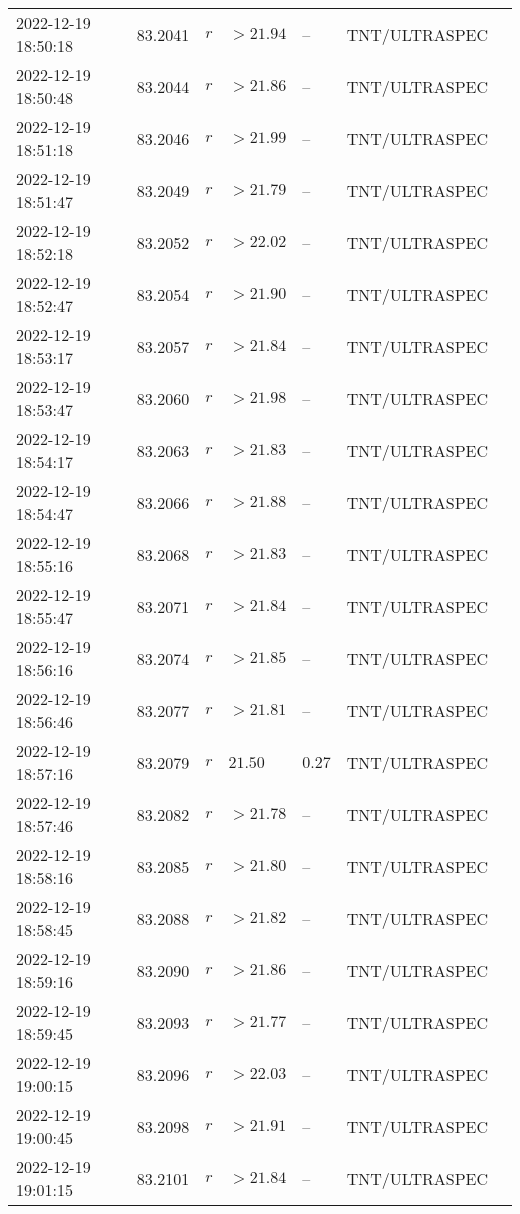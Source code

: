 \documentclass{nature_plusfigure}
\begin{document}
\begin{supplement}
\begin{center}
\begin{longtable}{lllllll}
2022-12-19 18:50:18 & 83.2041 & $r$ & $>21.94$ & -- & TNT/ULTRASPEC &  \\ 
2022-12-19 18:50:48 & 83.2044 & $r$ & $>21.86$ & -- & TNT/ULTRASPEC &  \\ 
2022-12-19 18:51:18 & 83.2046 & $r$ & $>21.99$ & -- & TNT/ULTRASPEC &  \\ 
2022-12-19 18:51:47 & 83.2049 & $r$ & $>21.79$ & -- & TNT/ULTRASPEC &  \\ 
2022-12-19 18:52:18 & 83.2052 & $r$ & $>22.02$ & -- & TNT/ULTRASPEC &  \\ 
2022-12-19 18:52:47 & 83.2054 & $r$ & $>21.90$ & -- & TNT/ULTRASPEC &  \\ 
2022-12-19 18:53:17 & 83.2057 & $r$ & $>21.84$ & -- & TNT/ULTRASPEC &  \\ 
2022-12-19 18:53:47 & 83.2060 & $r$ & $>21.98$ & -- & TNT/ULTRASPEC &  \\ 
2022-12-19 18:54:17 & 83.2063 & $r$ & $>21.83$ & -- & TNT/ULTRASPEC &  \\ 
2022-12-19 18:54:47 & 83.2066 & $r$ & $>21.88$ & -- & TNT/ULTRASPEC &  \\ 
2022-12-19 18:55:16 & 83.2068 & $r$ & $>21.83$ & -- & TNT/ULTRASPEC &  \\ 
2022-12-19 18:55:47 & 83.2071 & $r$ & $>21.84$ & -- & TNT/ULTRASPEC &  \\ 
2022-12-19 18:56:16 & 83.2074 & $r$ & $>21.85$ & -- & TNT/ULTRASPEC &  \\ 
2022-12-19 18:56:46 & 83.2077 & $r$ & $>21.81$ & -- & TNT/ULTRASPEC &  \\ 
2022-12-19 18:57:16 & 83.2079 & $r$ & $21.50$ & $0.27$ & TNT/ULTRASPEC &  \\ 
2022-12-19 18:57:46 & 83.2082 & $r$ & $>21.78$ & -- & TNT/ULTRASPEC &  \\ 
2022-12-19 18:58:16 & 83.2085 & $r$ & $>21.80$ & -- & TNT/ULTRASPEC &  \\ 
2022-12-19 18:58:45 & 83.2088 & $r$ & $>21.82$ & -- & TNT/ULTRASPEC &  \\ 
2022-12-19 18:59:16 & 83.2090 & $r$ & $>21.86$ & -- & TNT/ULTRASPEC &  \\ 
2022-12-19 18:59:45 & 83.2093 & $r$ & $>21.77$ & -- & TNT/ULTRASPEC &  \\ 
2022-12-19 19:00:15 & 83.2096 & $r$ & $>22.03$ & -- & TNT/ULTRASPEC &  \\ 
2022-12-19 19:00:45 & 83.2098 & $r$ & $>21.91$ & -- & TNT/ULTRASPEC &  \\ 
2022-12-19 19:01:15 & 83.2101 & $r$ & $>21.84$ & -- & TNT/ULTRASPEC &  \\ 

\end{longtable}
\end{center}
\end{supplement}
\end{document}
